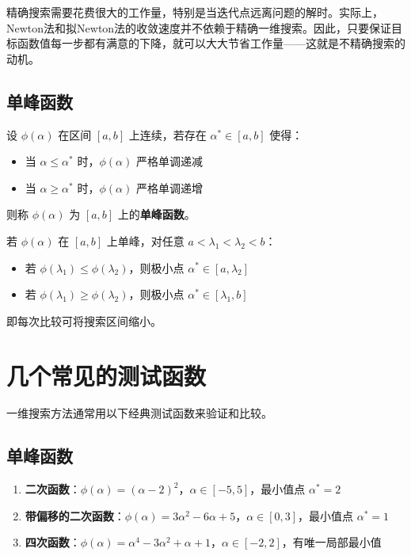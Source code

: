 \begin{notebox}[核心思想]
精确搜索需要花费很大的工作量，特别是当迭代点远离问题的解时。实际上，Newton法和拟Newton法的收敛速度并不依赖于精确一维搜索。因此，只要保证目标函数值每一步都有满意的下降，就可以大大节省工作量——这就是不精确搜索的动机。
\end{notebox}

\subsection{单峰函数}

\begin{definition}
设 $\phi(\alpha)$ 在区间 $[a, b]$ 上连续，若存在 $\alpha^* \in [a, b]$ 使得：
\begin{itemize}
    \item 当 $\alpha \leq \alpha^*$ 时，$\phi(\alpha)$ 严格单调递减
    \item 当 $\alpha \geq \alpha^*$ 时，$\phi(\alpha)$ 严格单调递增
\end{itemize}
则称 $\phi(\alpha)$ 为 $[a, b]$ 上的\textbf{单峰函数}。
\end{definition}

\begin{property}[单峰函数的关键性质]
若 $\phi(\alpha)$ 在 $[a, b]$ 上单峰，对任意 $a < \lambda_1 < \lambda_2 < b$：
\begin{itemize}
    \item 若 $\phi(\lambda_1) \leq \phi(\lambda_2)$，则极小点 $\alpha^* \in [a, \lambda_2]$
    \item 若 $\phi(\lambda_1) \geq \phi(\lambda_2)$，则极小点 $\alpha^* \in [\lambda_1, b]$
\end{itemize}
即每次比较可将搜索区间缩小。
\end{property}

\section{几个常见的测试函数}\label{sec:test-functions}

一维搜索方法通常用以下经典测试函数来验证和比较。

\subsection{单峰函数}

\begin{conceptbox}[常用单峰测试函数]
\begin{enumerate}[label=(\arabic*), leftmargin=2em]
    \item \textbf{二次函数}：$\phi(\alpha) = (\alpha - 2)^2$，$\alpha \in [-5, 5]$，最小值点 $\alpha^* = 2$
    \item \textbf{带偏移的二次函数}：$\phi(\alpha) = 3\alpha^2 - 6\alpha + 5$，$\alpha \in [0, 3]$，最小值点 $\alpha^* = 1$
    \item \textbf{四次函数}：$\phi(\alpha) = \alpha^4 - 3\alpha^2 + \alpha + 1$，$\alpha \in [-2, 2]$，有唯一局部最小值
\end{enumerate}
\end{conceptbox}

